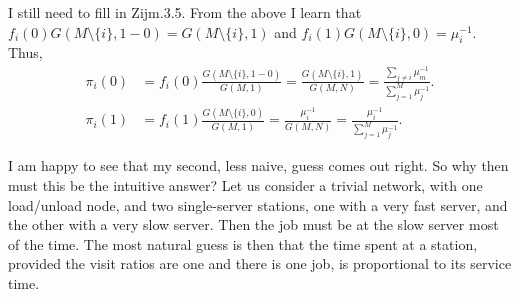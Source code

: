 \begin{exercise}
\begin{solution}
I still need to fill in Zijm.3.5. From the above I learn that
$f_i(0) G(M\setminus\{i\}, 1-0) = G(M\setminus\{i\}, 1)$ and
$f_i(1) G(M\setminus\{i\}, 0) = \mu_i^{-1}$. 
Thus, 
\begin{align*}
 \pi_i(0) &= f_i(0) \frac{G(M\setminus\{i\}, 1-0)}{G(M,1)} = \frac{G(M\setminus\{i\}, 1)}{G(M,N)} = 
\frac{\sum_{j\neq i} \mu_m^{-1}}{\sum_{j=1}^M \mu_j^{-1}}.
\\
 \pi_i(1) &= f_i(1) \frac{G(M\setminus\{i\}, 0)}{G(M,1)} = \frac{\mu_i^{-1}}{G(M,N)} = \frac{\mu_i^{-1}}{\sum_{j=1}^M \mu_j^{-1}}.
\end{align*}

I am happy to see that my second, less naive, guess comes out
right. So why then must this be the intuitive answer? Let us consider a
trivial network, with one load/unload node, and two single-server
stations, one with a very fast server, and the other with a very slow
server. Then the job must be at the slow server most of the time. The
most natural guess is then that the time spent at a station, provided
the visit ratios are one and there is one job, is proportional to its
service time.
\end{solution}
\end{exercise}


